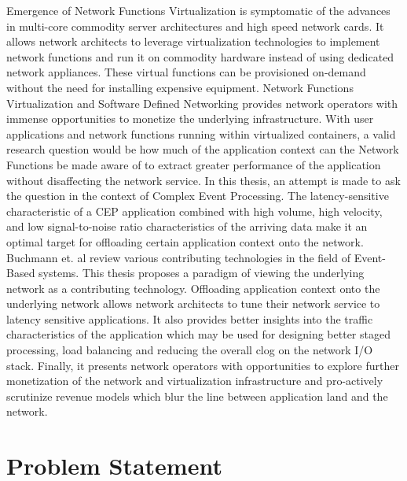 \newline \newline
Emergence of Network Functions Virtualization is symptomatic of the advances in multi-core commodity server architectures and high speed network cards. It allows network architects to leverage virtualization technologies to implement network functions and run it on commodity hardware instead of using dedicated network appliances. These virtual functions can be provisioned on-demand without the need for installing expensive equipment. Network Functions Virtualization and Software Defined Networking provides network operators with immense opportunities to monetize the underlying infrastructure. With user applications and network functions running within virtualized containers, a valid research question would be how much of the application context can the Network Functions be made aware of to extract greater performance of the application without disaffecting the network service. In this thesis, an attempt is made to ask the question in the context of Complex Event Processing. The latency-sensitive characteristic of a CEP application combined with high volume, high velocity, and low signal-to-noise ratio characteristics of the arriving data make it an optimal target for offloading certain application context onto the network.  
\newline \newline
Buchmann et. al \cite{Hinze:2009:EAE:1619258.1619260} review various contributing technologies in the field of Event-Based systems. This thesis proposes a paradigm of viewing the underlying network as a contributing technology. Offloading application context onto the underlying network allows network architects to tune their network service to latency sensitive applications. It also provides better insights into the traffic characteristics of the application which may be used for designing better staged processing,  load balancing and reducing the overall clog on the network I/O stack. Finally, it presents network operators with opportunities to explore further monetization of the network and virtualization infrastructure and pro-actively scrutinize revenue models which blur the line between application land and the network.

\section{Problem Statement}


